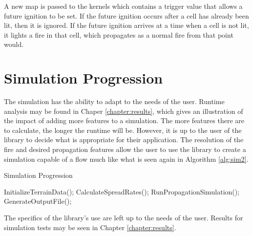 A new map is passed to the kernels which contains a trigger value that allows a future ignition to be set. If the future ignition occurs after a cell has already been lit, then it is ignored. If the future ignition arrives at a time when a cell is not lit, it lights a fire in that cell, which propagates as a normal fire from that point would. 

\section{Simulation Progression}
The simulation has the ability to adapt to the needs of the user. Runtime analysis may be found in Chaper \ref{chapter:results}, which gives an illustration of the impact of adding more features to a simulation. The more features there are to calculate, the longer the runtime will be. However, it is up to the user of the library to decide what is appropriate for their application. The resolution of the fire and desired propagation features allow the user to use the library to create a simulation capable of a flow much like what is seen again in Algorithm \ref{alg:sim2}.

\begin{algorithm}
  \caption{Simulation Progression}
  \label{alg:sim2}
  \begin{algorithmic}
  \STATE InitializeTerrainData();
  \STATE CalculateSpreadRates();
  \STATE RunPropagationSimulation();
  \ENDWHILE  
  \STATE GenerateOutputFile();
  \end{algorithmic}
\end{algorithm}

The specifics of the library's use are left up to the needs of the user. Results for simulation tests may be seen in Chapter \ref{chapter:results}. 